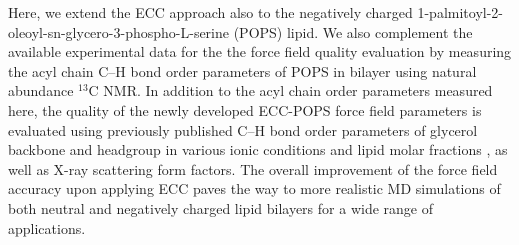 \documentclass[journal=jpcbfk,manuscript=article]{achemso}
\begin{document}
Here, we extend the ECC approach also to the negatively charged 1-palmitoyl-2-oleoyl-sn-glycero-3-phospho-L-serine (POPS) lipid.
We also complement the available experimental data for the the force field quality
evaluation by measuring the acyl chain C--H bond order parameters of POPS in bilayer using natural abundance $^{13}$C NMR.
In addition to the acyl chain order parameters measured here, the quality of the newly developed ECC-POPS force field parameters is
evaluated using previously published C--H bond order parameters of glycerol backbone and headgroup in various ionic
conditions and lipid molar fractions \cite{roux90,NMRlipidsIV}, as well as X-ray scattering form factors\cite{kucerka14}.
The overall improvement of the force field accuracy upon applying ECC
paves the way to more realistic MD simulations 
of both neutral and negatively charged lipid bilayers 
for a wide range of applications.


\end{document}
